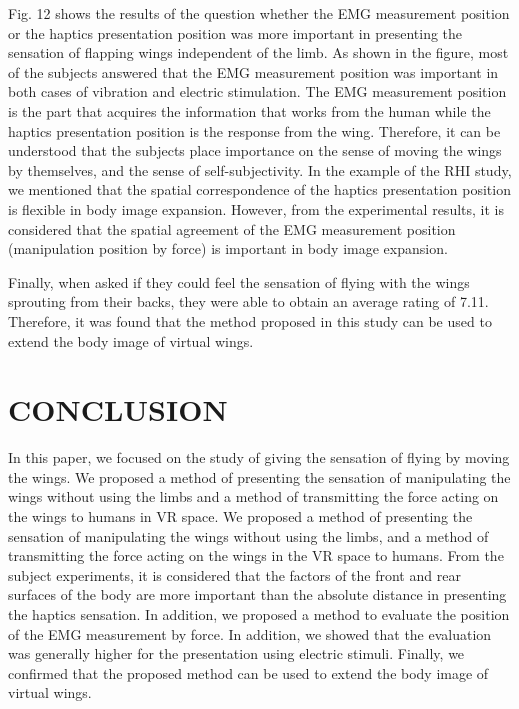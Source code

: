 \documentclass[letterpaper, 10 pt, conference]{ieeeconf}  %
\begin{document}
                Fig. 12 shows the results of the question whether the EMG measurement position or the haptics presentation position was more important in presenting the sensation of flapping wings independent of the limb. 
                As shown in the figure, most of the subjects answered that the EMG measurement position was important in both cases of vibration and electric stimulation.
                The EMG measurement position is the part that acquires the information that works from the human while the haptics presentation position is the response from the wing.
                Therefore, it can be understood that the subjects place importance on the sense of moving the wings by themselves, and the sense of self-subjectivity.
                In the example of the RHI study, we mentioned that the spatial correspondence of the haptics presentation position is flexible in body image expansion. However, from the experimental results, it is considered that the spatial agreement of the EMG measurement position (manipulation position by force) is important in body image expansion.

                Finally, when asked if they could feel the sensation of flying with the wings sprouting from their backs, they were able to obtain an average rating of 7.11. 
                Therefore, it was found that the method proposed in this study can be used to extend the body image of virtual wings.


\section{CONCLUSION}
        In this paper, we focused on the study of giving the sensation of flying by moving the wings. 
        We proposed a method of presenting the sensation of manipulating the wings without using the limbs and a method of transmitting the force acting on the wings to humans in VR space. 
        We proposed a method of presenting the sensation of manipulating the wings without using the limbs, and a method of transmitting the force acting on the wings in the VR space to humans. 
        From the subject experiments, it is considered that the factors of the front and rear surfaces of the body are more important than the absolute distance in presenting the haptics sensation. 
        In addition, we proposed a method to evaluate the position of the EMG measurement by force. 
        In addition, we showed that the evaluation was generally higher for the presentation using electric stimuli. 
        Finally, we confirmed that the proposed method can be used to extend the body image of virtual wings.
    
\end{document}
